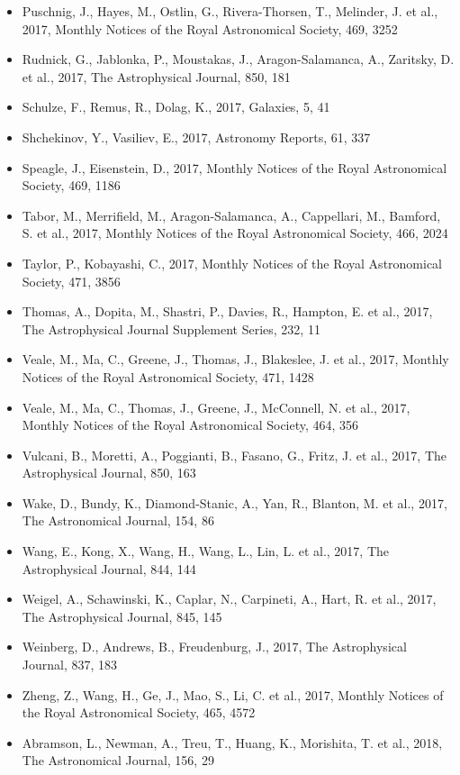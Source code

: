 \documentclass{letter}
\begin{document}
\begin{enumerate}
\begin{itemize}
\item Puschnig, J., Hayes, M., Ostlin, G., Rivera-Thorsen, T., Melinder, J. et al., 2017, Monthly Notices of the Royal Astronomical Society, 469, 3252
\item Rudnick, G., Jablonka, P., Moustakas, J., Aragon-Salamanca, A., Zaritsky, D. et al., 2017, The Astrophysical Journal, 850, 181
\item Schulze, F., Remus, R., Dolag, K., 2017, Galaxies, 5, 41
\item Shchekinov, Y., Vasiliev, E., 2017, Astronomy Reports, 61, 337
\item Speagle, J., Eisenstein, D., 2017, Monthly Notices of the Royal Astronomical Society, 469, 1186
\item Tabor, M., Merrifield, M., Aragon-Salamanca, A., Cappellari, M., Bamford, S. et al., 2017, Monthly Notices of the Royal Astronomical Society, 466, 2024
\item Taylor, P., Kobayashi, C., 2017, Monthly Notices of the Royal Astronomical Society, 471, 3856
\item Thomas, A., Dopita, M., Shastri, P., Davies, R., Hampton, E. et al., 2017, The Astrophysical Journal Supplement Series, 232, 11
\item Veale, M., Ma, C., Greene, J., Thomas, J., Blakeslee, J. et al., 2017, Monthly Notices of the Royal Astronomical Society, 471, 1428
\item Veale, M., Ma, C., Thomas, J., Greene, J., McConnell, N. et al., 2017, Monthly Notices of the Royal Astronomical Society, 464, 356
\item Vulcani, B., Moretti, A., Poggianti, B., Fasano, G., Fritz, J. et al., 2017, The Astrophysical Journal, 850, 163
\item Wake, D., Bundy, K., Diamond-Stanic, A., Yan, R., Blanton, M. et al., 2017, The Astronomical Journal, 154, 86
\item Wang, E., Kong, X., Wang, H., Wang, L., Lin, L. et al., 2017, The Astrophysical Journal, 844, 144
\item Weigel, A., Schawinski, K., Caplar, N., Carpineti, A., Hart, R. et al., 2017, The Astrophysical Journal, 845, 145
\item Weinberg, D., Andrews, B., Freudenburg, J., 2017, The Astrophysical Journal, 837, 183
\item Zheng, Z., Wang, H., Ge, J., Mao, S., Li, C. et al., 2017, Monthly Notices of the Royal Astronomical Society, 465, 4572
\item Abramson, L., Newman, A., Treu, T., Huang, K., Morishita, T. et al., 2018, The Astronomical Journal, 156, 29

\end{itemize}
\end{enumerate}
\end{document}
